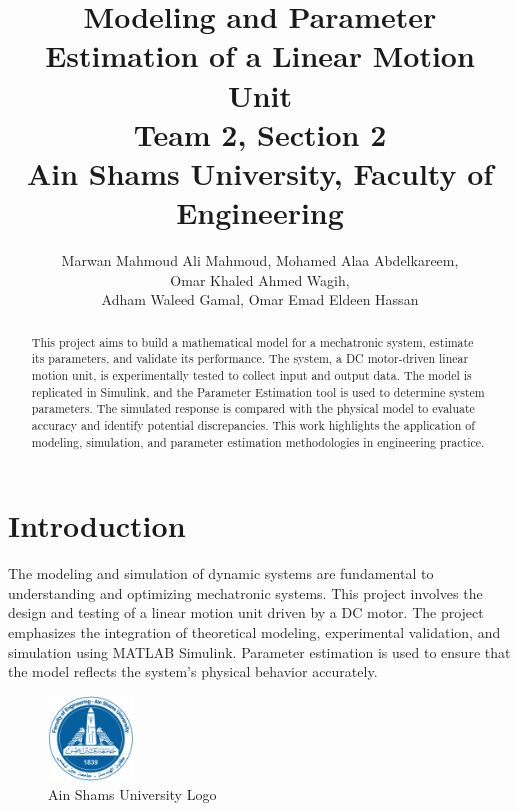 \documentclass{article}
\begin{document}
\title{Modeling and Parameter Estimation of a Linear Motion Unit\\
\bigskip
{\Large \textbf{Team 2, Section 2}} \\ %
\textbf{Ain Shams University, Faculty of Engineering} %
}

\author{Marwan Mahmoud Ali Mahmoud, Mohamed Alaa Abdelkareem, \\Omar Khaled Ahmed Wagih, \\ Adham Waleed Gamal, Omar Emad Eldeen Hassan}

\maketitle

\begin{abstract}
This project aims to build a mathematical model for a mechatronic system, estimate its parameters, and validate its performance. The system, a DC motor-driven linear motion unit, is experimentally tested to collect input and output data. The model is replicated in Simulink, and the Parameter Estimation tool is used to determine system parameters. The simulated response is compared with the physical model to evaluate accuracy and identify potential discrepancies. This work highlights the application of modeling, simulation, and parameter estimation methodologies in engineering practice.
\end{abstract}

\section{Introduction}
The modeling and simulation of dynamic systems are fundamental to understanding and optimizing mechatronic systems. This project involves the design and testing of a linear motion unit driven by a DC motor. The project emphasizes the integration of theoretical modeling, experimental validation, and simulation using MATLAB Simulink. Parameter estimation is used to ensure that the model reflects the system's physical behavior accurately.
\begin{figure}[H]
    \centering
    \includegraphics[width=0.2\textwidth]{asu.png}
\caption{Ain Shams University Logo}\label{fig:asu}
\end{figure}
\end{document}
